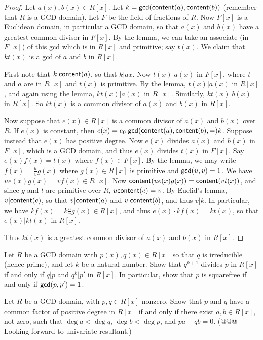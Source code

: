 \begin{proof}
Let \(a(x), b(x) \in R[x]\).
Let \(k = \mathsf{gcd}(\mathsf{content}(a), \mathsf{content}(b))\) (remember that \(R\) is a GCD domain).
Let \(F\) be the field of fractions of \(R\).
Now \(F[x]\) is a Euclidean domain, in particular a GCD domain, so that \(a(x)\) and \(b(x)\) have a greatest common divisor in \(F[x]\).
By the lemma, we can take an associate (in \(F[x]\)) of this gcd which is in \(R[x]\) and primitive; say \(t(x)\).
We claim that \(kt(x)\) is a gcd of \(a\) and \(b\) in \(R[x]\).

First note that \(k|\mathsf{content}(a)\), so that \(k|a{x}\).
Now \(t(x)|a(x)\) in \(F[x]\), where \(t\) and \(a\) are in \(R[x]\) and \(t(x)\) is primitive.
By the lemma, \(t(x)|a(x)\) in \(R[x]\), and again using the lemma, \(kt(x)|a(x)\) in \(R[x]\).
Similarly, \(kt(x)|b(x)\) in \(R[x]\).
So \(kt(x)\) is a common divisor of \(a(x)\) and \(b(x)\) in \(R[x]\).

Now suppose that \(e(x) \in R[x]\) is a common divisor of \(a(x)\) and \(b(x)\) over \(R\).
If \(e(x)\) is constant, then \(e(x) = e_0 | \mathsf{gcd}(\mathsf{content}(a), \mathsf{content}(b), =) k\).
Suppose instead that \(e(x)\) has positive degree.
Now \(e(x)\) divides \(a(x)\) and \(b(x)\) in \(F[x]\), which is a GCD domain, and thus \(e(x)\) divides \(t(x)\) in \(F[x]\).
Say \(e(x)f(x) = t(x)\) where \(f(x) \in F[x]\).
By the lemma, we may write \(f(x) = \frac{u}{v}g(x)\) where \(g(x) \in R[x]\) is primitive and \(\mathsf{gcd}(u, v) = 1\).
We have \(ue(x)g(x) = vf(x) \in R[x]\).
Now \(\mathsf{content}(ue(x)g(x)) = \mathsf{content}(vt(x))\), and since \(g\) and \(t\) are primitive over \(R\), \(u\mathsf{content}(e) = v\).
By Euclid's lemma, \(v|\mathsf{content}(e)\), so that \(v|\mathsf{content}(a)\) and \(v|\mathsf{content}(b)\), and thus \(v|k\).
In particular, we have \(kf(x) = k\frac{u}{v}g(x) \in R[x]\), and thus \(e(x) \cdot kf(x) = kt(x)\), so that \(e(x)|kt(x)\) in \(R[x]\).

Thus \(kt(x)\) is a greatest common divisor of \(a(x)\) and \(b(x)\) in \(R[x]\).
\end{proof}



\Exercises%

\begin{exercise}
Let \(R\) be a GCD domain with \(p(x), q(x) \in R[x]\) so that \(q\) is irreducible (hence prime), and let \(k\) be a natural number.
Show that \(q^{k+1}\) divides \(p\) in \(R[x]\) if and only if \(q|p\) and \(q^k|p'\) in \(R[x]\).
In particular, show that \(p\) is squarefree if and only if \(\mathsf{gcd}(p, p') = 1\).
\end{exercise}

\begin{exercise}
Let \(R\) be a GCD domain, with \(p,q \in R[x]\) nonzero.
Show that \(p\) and \(q\) have a common factor of positive degree in \(R[x]\) if and only if there exist \(a,b \in R[x]\), not zero, such that \(\deg{a} < \deg{q}\), \(\deg{b} < \deg{p}\), and \(pa - qb = 0\).
(@@@ Looking forward to univariate resultant.)
\end{exercise}
